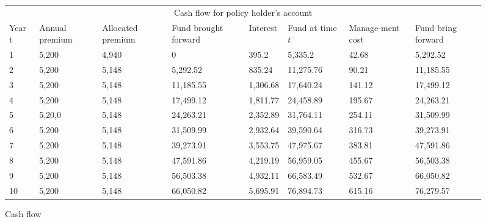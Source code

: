\documentclass{report}
\begin{document}
\begin{figure}[H]
\begin{tabular}{p{1cm} p{1.5cm} p{1.5cm} p{2cm} p{1.5cm} p{2cm} p{1.5cm} p{1.5cm} }
\toprule
\multicolumn{8}{c}{Cash flow for policy holder's account} \\
\cmidrule(r){3-7}

Year t & Annual premium & Allocated premium & Fund brought forward & Interest & Fund at time $t^-$ & Manage-ment cost & Fund bring forward \\
\midrule
1	&5,200	&4,940	&0&	395.2	&5,335.2	&42.68	&5,292.52\\
2	&5,200	&5,148	&5,292.52	 &   835.24	&11,275.76 &	90.21	&11,185.55\\
3	&5,200	&5,148	&11,185.55&  1,306.68	&17,640.24	&141.12  &17,499.12\\
4&	5,200	&5,148	&17,499.12&  1,811.77&	24,458.89	&    195.67       &24,263.21\\
5&	5,20,0	&5,148&	24,263.21	&    2,352.89&	31,764.11	&   254.11	&31,509.99\\
6&	5,200	&5,148&	31,509.99	&   2,932.64&	39,590.64	&   316.73	&39,273.91\\
7&	5,200	&5,148&	39,273.91	&   3,553.75&	47,975.67	&   383.81	&47,591.86\\
8&	5,200	&5,148&	47,591.86	&   4,219.19&	56,959.05	&  455.67	    &56,503.38\\
9&	5,200	&5,148&	56,503.38	&   4,932.11&	66,583.49	&  532.67 	&66,050.82\\
10&	5,200	&5,148	&66,050.82	&5,695.91	&76,894.73	&615.16	&76,279.57\\
\bottomrule
\end{tabular}
\label{fig:cashflow}
\caption{Cash flow}
\end{figure}
\end{document}
